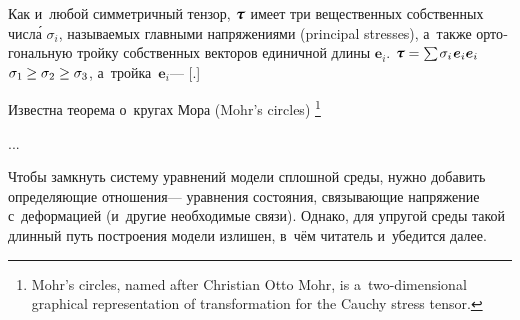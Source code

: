 \begin{otherlanguage}{russian}

Как и~любой симметричный тензор, $\cauchystress$ имеет три вещественных собственных числ\'{а} $\sigma_i$, называемых главными напряжениями (principal stresses), а~также ортогональную тройку собственных векторов единичной длины $\bm{e}_i$.
 ${\cauchystress = \sum \hspace{-0.16ex} \sigma_i \hspace{.16ex} \bm{e}_i \bm{e}_i}$   ${\sigma_1 \hspace{-0.1ex} \geq \sigma_2 \geq \sigma_3}$, а~тройка~${\bm{e}_i}$\:--- [.]

Известна теорема о~кругах Мора (Mohr’s circles)%
\footnote{Mohr’s circles, named after Christian Otto Mohr, is a~two-dimensional graphical representation of transformation for the Cauchy stress tensor.}

...



Чтобы замкнуть систему уравнений модели сплошной среды, нужно добавить определяющие отношения\:--- уравнения состояния, связывающие напряжение с~деформацией (и~другие необходимые связи). Однако, для упругой среды такой длинный путь построения модели излишен, в~чём читатель и~убедится далее.

\end{otherlanguage}



\label{para:virtualworkprinciple.elastic}



